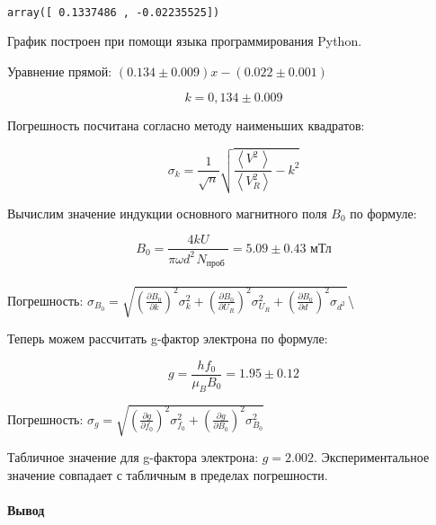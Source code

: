 \documentclass[11pt]{article}
\makeatletter
\newcommand{\boxspacing}{\kern\kvtcb@left@rule\kern\kvtcb@boxsep}
\newcommand{\prompt}[4]{
        {\ttfamily\llap{{\color{#2}[#3]:\hspace{3pt}#4}}\vspace{-\baselineskip}}
    }
\makeatother
\begin{document}
    \begin{center}
    \end{center}
    { \hspace*{\fill} \\}
    
            \begin{tcolorbox}[breakable, size=fbox, boxrule=.5pt, pad at break*=1mm, opacityfill=0]
\prompt{Out}{outcolor}{34}{\boxspacing}
\begin{Verbatim}[commandchars=\\\{\}]
array([ 0.1337486 , -0.02235525])
\end{Verbatim}
\end{tcolorbox}
        
    График построен при помощи языка программирования Python.

Уравнение прямой: \((0.134 \pm 0.009)x - (0.022 \pm 0.001)\)

\[k = 0,134 \pm 0.009\]

Погрешность посчитана согласно методу наименьших квадратов:

\[
\sigma_{k}=\frac{1}{\sqrt{n}} \sqrt{\frac{\left\langle V_{\text { }}^{2}\right\rangle}{\left\langle V_{R}^{2}\right\rangle}-k^{2}}
\]

Вычислим значение индукции основного магнитного поля \(B_0\) по формуле:

\[
B_{0}=\frac{4 k U}{\pi \omega d_{\text { }}^{2} N_{\text {проб }}} = 5.09 \pm 0.43 \text{ мТл}
\]\\
Погрешность:
\(\sigma_{B_{0}}=\sqrt{\left(\frac{\partial B_{0}}{\partial k}\right)^{2} \sigma_{k}^{2}+\left(\frac{\partial B_{0}}{\partial U_{R}}\right)^{2} \sigma_{U_{R}}^{2}+\left(\frac{\partial B_{0}}{\partial d_{\text { }}}\right)^{2} \sigma_{d_{\text { }}^{2}}}\)\textbackslash{}

Теперь можем рассчитать g-фактор электрона по формуле:

\[
g=\frac{h f_{0}}{\mu_{B} B_{0}} = 1.95 \pm 0.12 
\]

Погрешность:
\(\sigma_{g}=\sqrt{\left(\frac{\partial g}{\partial f_{0}}\right)^{2} \sigma_{f_{0}}^{2}+\left(\frac{\partial g}{\partial B_{0}}\right)^{2} \sigma_{B_{0}}^{2}}\)

Табличное значение для g-фактора электрона: \(g = 2.002\).
Экспериментальное значение совпадает с табличным в пределах погрешности.

    \hypertarget{ux432ux44bux432ux43eux434}{%
\paragraph{Вывод}\label{ux432ux44bux432ux43eux434}}
\end{document}
